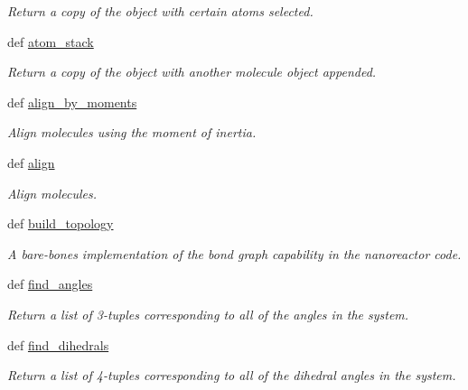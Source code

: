\begin{DoxyCompactItemize}
\begin{DoxyCompactList}\small\item\em Return a copy of the object with certain atoms selected. \end{DoxyCompactList}\item 
def \hyperlink{classforcebalance_1_1molecule_1_1Molecule_a63dd7bc0347cc3dec5e8fa0ebfd567ec}{atom\-\_\-stack}
\begin{DoxyCompactList}\small\item\em Return a copy of the object with another molecule object appended. \end{DoxyCompactList}\item 
def \hyperlink{classforcebalance_1_1molecule_1_1Molecule_a685c8092020a46cd7cf5b52ab45ca6e4}{align\-\_\-by\-\_\-moments}
\begin{DoxyCompactList}\small\item\em Align molecules using the moment of inertia. \end{DoxyCompactList}\item 
def \hyperlink{classforcebalance_1_1molecule_1_1Molecule_a87e66db685214a9cdd4feff49d4ea5dc}{align}
\begin{DoxyCompactList}\small\item\em Align molecules. \end{DoxyCompactList}\item 
def \hyperlink{classforcebalance_1_1molecule_1_1Molecule_a071f18dacd881f761462f772bb0cf632}{build\-\_\-topology}
\begin{DoxyCompactList}\small\item\em A bare-\/bones implementation of the bond graph capability in the nanoreactor code. \end{DoxyCompactList}\item 
def \hyperlink{classforcebalance_1_1molecule_1_1Molecule_aa69056db05f047be1b4ae1e8f132d978}{find\-\_\-angles}
\begin{DoxyCompactList}\small\item\em Return a list of 3-\/tuples corresponding to all of the angles in the system. \end{DoxyCompactList}\item 
def \hyperlink{classforcebalance_1_1molecule_1_1Molecule_a1d93b050bdb0d434b436d0c5803ccdec}{find\-\_\-dihedrals}
\begin{DoxyCompactList}\small\item\em Return a list of 4-\/tuples corresponding to all of the dihedral angles in the system. \end{DoxyCompactList}\item 

\end{DoxyCompactItemize}
